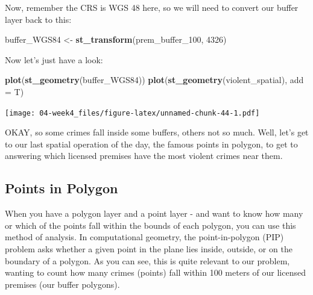 \documentclass[]{book}
\newenvironment{Shaded}{\begin{snugshade}}{\end{snugshade}}
\newcommand{\DataTypeTok}[1]{\textcolor[rgb]{0.13,0.29,0.53}{#1}}
\newcommand{\DecValTok}[1]{\textcolor[rgb]{0.00,0.00,0.81}{#1}}
\newcommand{\KeywordTok}[1]{\textcolor[rgb]{0.13,0.29,0.53}{\textbf{#1}}}
\newcommand{\NormalTok}[1]{#1}
\newcommand{\OperatorTok}[1]{\textcolor[rgb]{0.81,0.36,0.00}{\textbf{#1}}}
\newcommand{\OtherTok}[1]{\textcolor[rgb]{0.56,0.35,0.01}{#1}}
\newcommand{\StringTok}[1]{\textcolor[rgb]{0.31,0.60,0.02}{#1}}
\begin{document}
Now, remember the CRS is WGS 48 here, so we will need to convert our buffer layer back to this:

\begin{Shaded}
\begin{Highlighting}[]
\NormalTok{buffer_WGS84 <-}\StringTok{ }\KeywordTok{st_transform}\NormalTok{(prem_buffer_}\DecValTok{100}\NormalTok{, }\DecValTok{4326}\NormalTok{)}
\end{Highlighting}
\end{Shaded}

Now let's just have a look:

\begin{Shaded}
\begin{Highlighting}[]
\KeywordTok{plot}\NormalTok{(}\KeywordTok{st_geometry}\NormalTok{(buffer_WGS84))}
\KeywordTok{plot}\NormalTok{(}\KeywordTok{st_geometry}\NormalTok{(violent_spatial), }\DataTypeTok{add =}\NormalTok{ T)}
\end{Highlighting}
\end{Shaded}

\texttt{[image: 04-week4\_files/figure-latex/unnamed-chunk-44-1.pdf]}

OKAY, so some crimes fall inside some buffers, others not so much. Well, let's get to our last spatial operation of the day, the famous points in polygon, to get to answering which licensed premises have the most violent crimes near them.

\hypertarget{points-in-polygon}{%
\subsection{Points in Polygon}\label{points-in-polygon}}

When you have a polygon layer and a point layer - and want to know how many or which of the points fall within the bounds of each polygon, you can use this method of analysis. In computational geometry, the point-in-polygon (PIP) problem asks whether a given point in the plane lies inside, outside, or on the boundary of a polygon. As you can see, this is quite relevant to our problem, wanting to count how many crimes (points) fall within 100 meters of our licensed premises (our buffer polygons).

\begin{Shaded}
\end{Shaded}
\end{document}
